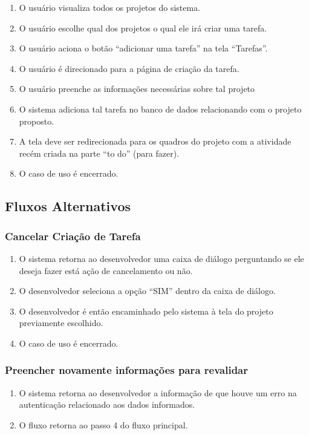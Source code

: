 \begin{enumerate}
  \item O usuário visualiza todos os projetos do sistema.
  \item O usuário escolhe qual dos projetos o qual ele irá criar uma tarefa.
  \item O usuário aciona o botão “adicionar uma tarefa” na tela “Tarefas”.
  \item O usuário é direcionado para a página de criação da tarefa.
  \item O usuário preenche as informações necessárias sobre tal projeto
  \item O sistema adiciona tal tarefa no banco de dados relacionando com o projeto proposto.
  \item A tela deve ser redirecionada para os quadros do projeto com a atividade recém criada na parte “to do” (para fazer).
  \item O caso de uso é encerrado. 
\end{enumerate}

\subsection{Fluxos Alternativos}

\subsubsection{Cancelar Criação de Tarefa}

\begin{enumerate}
  \item O sistema retorna ao desenvolvedor uma caixa de diálogo perguntando se ele deseja fazer está ação de cancelamento ou não.
  \item O desenvolvedor seleciona a opção “SIM” dentro da caixa de diálogo.
  \item O desenvolvedor é então encaminhado pelo sistema à tela do projeto previamente escolhido.
  \item O caso de uso é encerrado.
\end{enumerate}

\subsubsection{Preencher novamente informações para revalidar}

\begin{enumerate}
  \item O sistema retorna ao desenvolvedor a informação de que houve um erro na autenticação relacionado aos dados informados.
  \item O fluxo retorna ao passo 4 do fluxo principal.
\end{enumerate}

